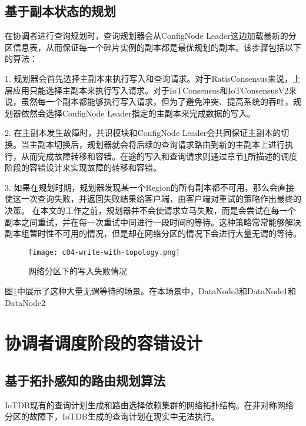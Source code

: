 \subsection{基于副本状态的规划}

在协调者进行查询规划时，查询规划器会从ConfigNode Leader这边加载最新的分区信息表，从而保证每一个碎片实例的副本都是最优规划的副本。该步骤包括以下的算法：

1. 规划器会首先选择主副本来执行写入和查询请求。对于RatisConsensus来说，上层应用只能选择主副本来执行写入请求。对于IoTConsensus和IoTConsensusV2来说，虽然每一个副本都能够执行写入请求，但为了避免冲突、提高系统的吞吐，规划器依然会选择ConfigNode Leader指定的主副本来完成数据的写入。

2. 在主副本发生故障时，共识模块和ConfigNode Leader会共同保证主副本的切换。当主副本切换后，规划器就会将后续的查询请求路由到新的主副本上进行执行，从而完成故障转移和容错。在途的写入和查询请求则通过章节\ref{sec:failover-schedule}所描述的调度阶段的容错设计来实现故障的转移和容错。

3. 如果在规划时期，规划器发现某一个Region的所有副本都不可用，那么会直接使这一次查询失败，并返回失败结果给客户端，由客户端对重试的策略作出最终的决策。
在本文的工作之前，规划器并不会使请求立马失败，而是会尝试在每一个副本之间重试，并在每一次重试中间进行一段时间的等待。这种策略常常能够解决副本组暂时性不可用的情况，但是却在网络分区的情况下会进行大量无谓的等待。

\begin{figure}
  \centering
  \texttt{[image: c04-write-with-topology.png]}
  \caption{网络分区下的写入失败情况}
  \label{fig:c04-write-with-topology}
\end{figure}

图\ref{fig:c04-write-with-topology}中展示了这种大量无谓等待的场景。在本场景中，DataNode3和DataNode1和DataNode2


\section{协调者调度阶段的容错设计}\label{sec:failover-schedule}





\subsection{基于拓扑感知的路由规划算法}

IoTDB现有的查询计划生成和路由选择依赖集群的网络拓扑结构。在非对称网络分区的故障下，IoTDB生成的查询计划在现实中无法执行。



